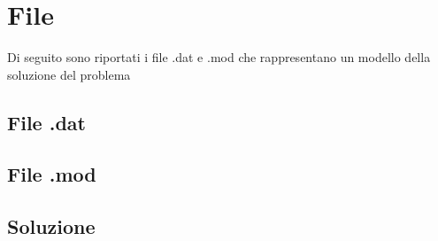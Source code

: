 \documentclass[12pt]{article} %
\begin{document}
	\newpage

\section{File}
Di seguito sono riportati i file .dat e .mod che rappresentano un modello della soluzione del problema

\subsection{File .dat}


\newpage

\subsection{File .mod}


\newpage

\subsection{Soluzione}

\end{document}
